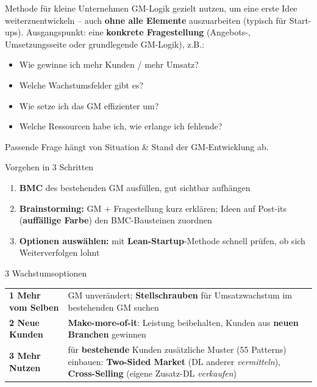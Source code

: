 \documentclass[a4paper, fontsize=7pt]{scrartcl}
\renewcommand*{\arraystretch}{1.5}  %
\begin{document}
\begin{mainbox}{Methode für kleine Unternehmen}
GM-Logik gezielt nutzen, um eine erste Idee weiterzuentwickeln -- auch
\textbf{ohne alle Elemente} auszuarbeiten (typisch für Start-ups).
Ausgangspunkt: eine \textbf{konkrete Fragestellung} (Angebots-,
Umsetzungsseite oder grundlegende GM-Logik), z.B.:
\begin{itemize}
    \item Wie gewinne ich mehr Kunden / mehr Umsatz?
    \item Welche Wachstumsfelder gibt es?
    \item Wie setze ich das GM effizienter um?
    \item Welche Ressourcen habe ich, wie erlange ich fehlende?
\end{itemize}
Passende Frage hängt von Situation \& Stand der GM-Entwicklung ab.
\end{mainbox}

\begin{mainbox}{Vorgehen in 3 Schritten}
\begin{enumerate}
    \item \textbf{BMC} des bestehenden GM ausfüllen, gut sichtbar aufhängen
    \item \textbf{Brainstorming:} GM + Fragestellung kurz erklären; Ideen
    auf Post-its (\textbf{auffällige Farbe}) den BMC-Bausteinen zuordnen
    \item \textbf{Optionen auswählen:} mit \textbf{Lean-Startup}-Methode
    schnell prüfen, ob sich Weiterverfolgen lohnt
\end{enumerate}
\end{mainbox}

\begin{mainbox}{3 Wachstumsoptionen}
\renewcommand*{\arraystretch}{1.2}
\begin{tabularx}{\linewidth}{@{}lX@{}}
\textbf{1 Mehr vom Selben} & GM unverändert; \textbf{Stellschrauben} für
Umsatzwachstum im bestehenden GM suchen \\
\textbf{2 Neue Kunden} & \textbf{Make-more-of-it}: Leistung beibehalten,
Kunden aus \textbf{neuen Branchen} gewinnen \\
\textbf{3 Mehr Nutzen} & für \textbf{bestehende} Kunden zusätzliche Muster
(55 Patterns) einbauen: \textbf{Two-Sided Market} (DL anderer
\emph{vermitteln}), \textbf{Cross-Selling} (eigene Zusatz-DL
\emph{verkaufen}) \\
\end{tabularx}
\end{mainbox}
\end{document}
